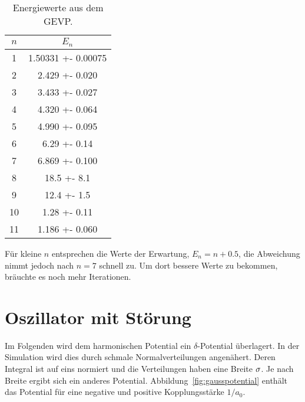 \begin{table}
    \centering
    \begin{tabular}{SS}
        {$n$} & {$E_n$} \\
         & 1.50331 +- 0.00075 \\
         2 &   2.429 +- 0.020   \\
         3 &   3.433 +- 0.027   \\
         4 &   4.320 +- 0.064   \\
         5 &   4.990 +- 0.095   \\
         6 &    6.29 +- 0.14    \\
         7 &   6.869 +- 0.100   \\
         8 &    18.5 +- 8.1     \\
         9 &    12.4 +- 1.5     \\
        10 &    1.28 +- 0.11    \\
        11 &   1.186 +- 0.060  
    \end{tabular}
    \caption{%
        Energiewerte aus dem GEVP.
    }
    \label{tab:ED7AA2-eigenwerte}
\end{table}

Für kleine $n$ entsprechen die Werte der Erwartung, $E_n = n + \num{0.5}$, die
Abweichung nimmt jedoch nach $n = 7$ schnell zu. Um dort bessere Werte zu
bekommen, bräuchte es noch mehr Iterationen.

\FloatBarrier
\section{Oszillator mit Störung}

Im Folgenden wird dem harmonischen Potential ein $\delta$-Potential überlagert.
In der Simulation wird dies durch schmale Normalverteilungen angenähert. Deren
Integral ist auf eins normiert und die Verteilungen haben eine Breite
$\sigma$. Je nach Breite ergibt sich ein anderes Potential.
Abbildung~\ref{fig:gausspotential} enthält das Potential für eine negative und
positive Kopplungsstärke $1/a_0$.

